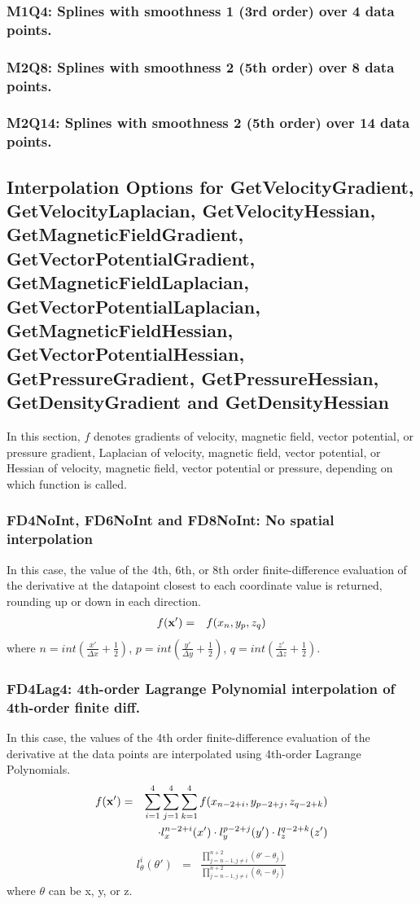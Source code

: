 \documentclass[11pt]{article}
\def\bea{\begin{eqnarray}}
\def\eea{\end{eqnarray}}
\begin{document}
\subsubsection*{M1Q4: Splines with smoothness 1 (3rd order) over 4 data points.}
\subsubsection*{M2Q8: Splines with smoothness 2 (5th order) over 8 data points.}
\subsubsection*{M2Q14: Splines with smoothness 2 (5th order) over 14 data points.}

\subsection{Interpolation Options for GetVelocityGradient, GetVelocityLaplacian, GetVelocityHessian, GetMagneticFieldGradient, GetVectorPotentialGradient,
 GetMagneticFieldLaplacian, GetVectorPotentialLaplacian, GetMagneticFieldHessian, GetVectorPotentialHessian, GetPressureGradient, GetPressureHessian, GetDensityGradient
 and GetDensityHessian}

In this section, $f$ denotes gradients of velocity, magnetic field, vector potential, or pressure gradient,
Laplacian of velocity, magnetic field, vector potential, or Hessian of velocity, magnetic field, vector potential or pressure, depending on
which function is called.
\subsubsection*{FD4NoInt, FD6NoInt and FD8NoInt: No spatial  interpolation}

In this case, the value of the 4th, 6th, or 8th order finite-difference
evaluation of the derivative at the datapoint closest to each coordinate value is
returned, rounding up or down in each direction.
\bea f({\bf x'}) &=& f(x_n,y_p,z_q)\eea where
$n=int(\frac{x'}{\Delta x}+\frac{1}{2})$, $p=int(\frac{y'}{\Delta
y}+\frac{1}{2})$, $q=int(\frac{z'}{\Delta z}+\frac{1}{2})$.

\subsubsection*{FD4Lag4: 4th-order Lagrange Polynomial interpolation of 4th-order finite diff.}

In this case, the values of the 4th order finite-difference
evaluation of the derivative at the data points are interpolated using 4th-order Lagrange Polynomials.
\bea f({\bf x'}) &=&
\sum_{i=1}^4\sum_{j=1}^4\sum_{k=1}^4f(x_{n-2+i},y_{p-2+j},z_{q-2+k})\nonumber\\
&&\cdot l_x^{n-2+i}(x')\cdot l_y^{p-2+j}(y')\cdot
l_z^{q-2+k}(z')\eea \bea l_\theta^i(\theta') &=&
\frac{\prod\limits_{j=n-1,j\neq
i}^{n+2}(\theta'-\theta_j)}{\prod\limits_{j=n-1,j\neq
i}^{n+2}(\theta_i-\theta_j)}\eea where $\theta$ can be x, y, or z.
\end{document}
